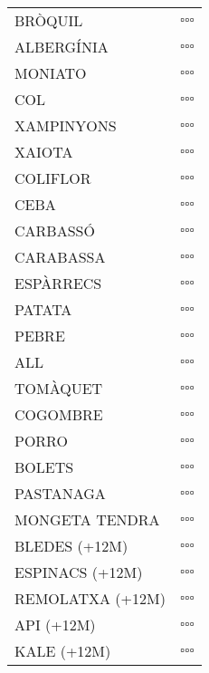 \documentclass[landscape,a0paper,fontscale=0.285]{baposter} %
\begin{document}
\begin{poster}
{\begin{tabular}{p{}p{}}
BRÒQUIL & $\square\square\square$ \\
ALBERGÍNIA & $\square\square\square$ \\
MONIATO & $\square\square\square$ \\
COL & $\square\square\square$ \\
XAMPINYONS & $\square\square\square$ \\
XAIOTA & $\square\square\square$ \\
COLIFLOR & $\square\square\square$ \\
CEBA & $\square\square\square$ \\
CARBASSÓ & $\square\square\square$ \\
CARABASSA & $\square\square\square$ \\
ESPÀRRECS & $\square\square\square$ \\
PATATA & $\square\square\square$ \\
PEBRE & $\square\square\square$ \\
ALL & $\square\square\square$ \\
TOMÀQUET & $\square\square\square$ \\
COGOMBRE & $\square\square\square$ \\
PORRO & $\square\square\square$ \\
BOLETS & $\square\square\square$ \\
PASTANAGA & $\square\square\square$ \\
MONGETA TENDRA & $\square\square\square$ \\
BLEDES (+12M) & $\square\square\square$ \\
ESPINACS (+12M) & $\square\square\square$ \\
REMOLATXA (+12M) & $\square\square\square$ \\
API (+12M) & $\square\square\square$ \\
KALE (+12M) & $\square\square\square$ \\
\end{tabular}

}

\end{poster}
\end{document}
